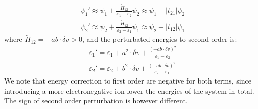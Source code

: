\documentclass{article}
\begin{document}
\begin{align*}
    \psi_1' \approx \psi_1 + \frac{\tilde{H}_{12}}{\varepsilon_1 - \varepsilon_2} \psi_2 \approx \psi_1 - |t_{21}| \psi_2 \\ 
    \psi_2' \approx \psi_2 + \frac{\tilde{H}_{12}}{\varepsilon_2 - \varepsilon_1} \psi_1 \approx \psi_2 + |t_{12}| \psi_1
\end{align*}
where $\tilde{H}_{12} = -ab\cdot \delta v > 0$, and the perturbated energies to second order is:
\begin{align*}
    \varepsilon_1' = \varepsilon_1 + a^2 \cdot \delta v + \frac{(-ab\cdot \delta v)^2}{\varepsilon_1 - \varepsilon_2} \\ 
    \varepsilon_2' = \varepsilon_2 + b^2 \cdot \delta v + \frac{(-ab\cdot \delta v)^2}{\varepsilon_2 - \varepsilon_1} 
\end{align*}
We note that energy correction to first order are negative for both terms, since introducing a more electronegative ion 
lower the energies of the system in total. The sign of second order perturbation is however different.
\end{document}
